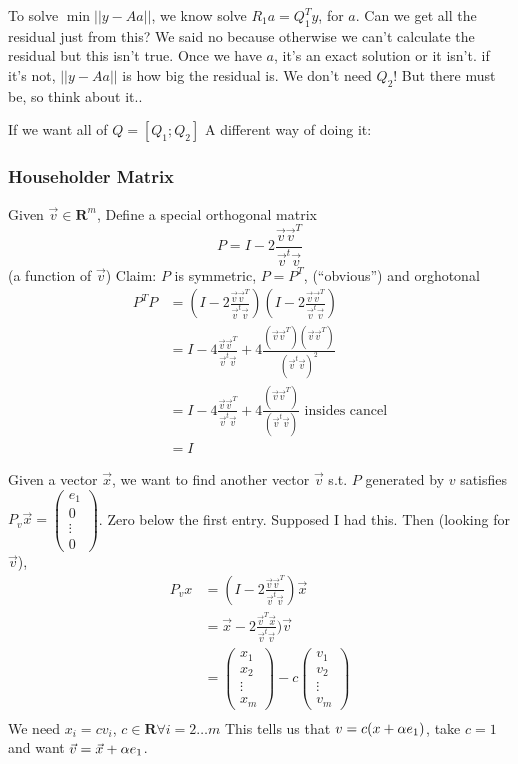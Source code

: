 To solve $\min ||y-Aa||$, we know solve $R_1a = Q_1^Ty$, for $a$. Can
we get all the residual just from this? We said no because otherwise
we can't calculate the residual but this isn't true. Once we have $a$, it's an exact solution or it isn't. if it's
not, $||y-Aa||$ is how big the residual is. We don't need $Q_2$! But
there must be, so think about it..

If we want all of $Q=[Q_1; Q_2]$ A different way of doing it:
\subsubsection{Householder Matrix}
Given $\vec v\in \mathbf{R}^m$, Define a special orthogonal matrix 
$$P= I - 2\frac{\vec v \vec v^T}{\vec v^t\vec v}$$ (a function of
$\vec v$)
Claim: $P$ is symmetric, $P=P^T$, (``obvious'') and orghotonal
\begin{align*}
P^TP &= (I - 2\frac{\vec v \vec v^T}{\vec v^t\vec v})(I - 2\frac{\vec
  v \vec v^T}{\vec v^t\vec v})\\  
&= I - 4\frac{\vec v \vec v^T}{\vec v^t\vec v} + 4 \frac{(\vec v \vec
  v^T)(\vec v \vec v^T)}{(\vec v^t\vec v)^2}\\
&= I - 4\frac{\vec v \vec v^T}{\vec v^t\vec v} + 4 \frac{(\vec v\vec
  v^T)}{(\vec v^t\vec v)} \text{ insides cancel}\\
&= I
\end{align*}

Given a vector $\vec x$, we want to find another vector $\vec v$ s.t.
$P$ generated by $v$ satisfies $P_v\vec x =(
\begin{smallmatrix}
  e_1 \\ 0 \\ \vdots \\ 0
\end{smallmatrix})$. Zero below the first entry. Supposed I had
this. Then (looking for $\vec v$),
\begin{align*}
  P_vx &= (I - 2\frac{\vec v \vec v^T}{\vec v^t\vec v})\vec x\\
&= \vec x - 2\frac{\vec v^T \vec x}{\vec v^t\vec v})\vec v\\
&=
\begin{pmatrix}
  x_1\\x_2\\ \vdots \\ x_m
\end{pmatrix} - c\begin{pmatrix}
  v_1\\v_2\\ \vdots \\ v_m
\end{pmatrix} \\
\end{align*}
We need $x_i = cv_i$, $c\in \mathbf{R} \forall i=2\dots m$
This tells us that $v = c(x+ \alpha e_1)$, take $c=1$ and want $\vec v =
\vec x + \alpha e_1$. 

